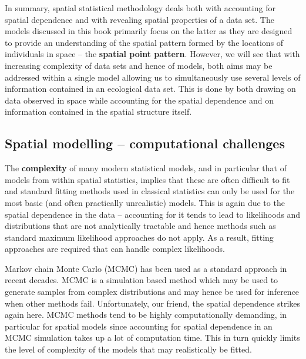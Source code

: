 In summary, spatial statistical methodology deals both with accounting for spatial dependence and with revealing spatial properties of a data set.  The models discussed in this book primarily focus on the latter as they are designed to provide an understanding of the spatial pattern formed by the locations of individuals in space -- the \textbf{spatial point pattern}. However, we will see that with increasing complexity of data sets and hence of models, both aims may be addressed within a single model allowing us to simultaneously use several levels of information contained in an ecological data set. This is done by both drawing on data observed in space while accounting for the spatial dependence and on information contained in the spatial structure itself.

\subsection{Spatial modelling -- computational challenges }

The \textbf{complexity} of many modern statistical models, and in particular that of models from within spatial statistics, implies that these are often difficult to fit and standard fitting methods used in classical statistics can only be used for the most basic (and often practically unrealistic) models. This is again due to the spatial dependence in the data  -- accounting for it tends to lead to likelihoods and distributions that are not analytically tractable and hence methods such as standard maximum likelihood approaches do not apply. As a result, fitting approaches are required that can handle complex likelihoods. 

Markov chain Monte Carlo (MCMC) has been used as a standard approach in recent decades. MCMC is a simulation based method which may be used to generate samples from complex distributions and may hence be used for inference when other methods fail. Unfortunately, our friend, the spatial dependence strikes again here. MCMC methods tend to be highly computationally demanding, in particular for spatial models since accounting for spatial dependence in an MCMC simulation takes up a lot of computation time. This in turn quickly limits the level of complexity of the models that may realistically be fitted.

